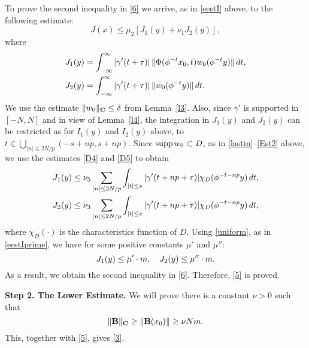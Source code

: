 To prove the second inequality in \eqref{6} we arrive, as 
in \eqref{eestI} above, to the
following estimate:
$$
J(x) \leq \mu_2 \left[ J_1(y) + \nu_1 J_2(y) \right],
$$
where
\begin{align}
J_1(y) &= \int_{-\infty}^\infty | \gam' (t+\tau) | \, \| \Phi (\phi^{-t}
x_0, t) w_0 (\phi^{-t} y) \| \, dt,
\lb{J1}\\
J_2(y) & = \int_{-\infty}^\infty | \gam' (t+\tau)| \, \| w_0
(\phi^{-t} y) \| \, dt.
\lb{J2}
\end{align}
We use the estimate 
$\| w_0 \|_{{\bold C}} \leq \delta$ from Lemma~\ref{l3}.
Also, since $\gamma'$ is supported in $[-N,N]$
and in view of Lemma~\ref{l4}, the integration in $J_1(y)$ and $J_2(y)$ can
be restricted
as for $I_1(y)$ and $I_2(y)$
above, to
$t\in\bigcup_{|n|\leq 2N/p} (-s + np, s+np)$.  
Since $\operatorname{supp} w_0\subset D$, as in \eqref{lastin}--\eqref{Est2} above, 
we use the estimates
\eqref{D4} and \eqref{D5}
to obtain
\begin{align*}
J_1(y) &\leq  \nu_5\sum_{|n|\leq 2N/p} \int_{|t| \leq s} |\gamma' (t+n p + \tau) |
\chi_D (\phi^{-t-np} y)  \, dt,\\
J_2(y) &\leq  \nu_3\sum_{|n|\leq 2N/p} \int_{|t| \leq s} |\gamma' (t+n p + \tau) |
\chi_D (\phi^{-t-np} y)  \, dt,
\end{align*}
where $\chi_D(\cdot)$ is the characteristics function of $D$.  Using
\eqref{uniform}, as in
\eqref{eestIprime}, we have for some positive constants $\mu'$ and $\mu''$:
\begin{equation}
J_1(y) \leq \mu'\cdot m,\quad J_2(y) \leq \mu''\cdot m.
\lb{8}
\end{equation}
As a result, we obtain the second inequality in \eqref{6}.  
Therefore, \eqref{5} is proved.

{\bf Step 2.  The Lower Estimate.}
We will prove there is a constant $\nu>0$ such that
$$
 \| {\bold B} \|_{{\bold C}} \geq \| {\bold B} (x_0)\| \geq \nu N  m.
$$
This, together with \eqref{5}, gives \eqref{3}.

